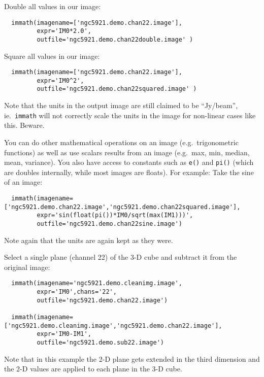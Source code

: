 Double all values in our image:
\small
\begin{verbatim}
  immath(imagename=['ngc5921.demo.chan22.image'],
         expr='IM0*2.0',
         outfile='ngc5921.demo.chan22double.image' )
\end{verbatim}
\normalsize
    
Square all values in our image:
\small
\begin{verbatim}
  immath(imagename=['ngc5921.demo.chan22.image'],
         expr='IM0^2',
         outfile='ngc5921.demo.chan22squared.image' )
\end{verbatim}
\normalsize
Note that the units in the output image are still claimed to be
``Jy/beam'', ie.\ {\tt immath} will not correctly scale the units
in the image for non-linear cases like this.  Beware.

You can do other mathematical operations on an image (e.g.\
trigonometric functions) as well as use scalars results from an image
(e.g.\ max, min, median, mean, variance).  You also have access to
constants such as {\tt e()} and {\tt pi()} (which are doubles
internally, while most images are floats). For example:
Take the sine of an image:
\small
\begin{verbatim}
  immath(imagename=['ngc5921.demo.chan22.image','ngc5921.demo.chan22squared.image'],
         expr='sin(float(pi())*IM0/sqrt(max(IM1)))',
         outfile='ngc5921.demo.chan22sine.image')
\end{verbatim}
\normalsize
Note again that the units are again kept as they were.
    
Select a single plane (channel 22) of the 3-D cube and  
subtract it from the original image: 
\small
\begin{verbatim}
  immath(imagename='ngc5921.demo.cleanimg.image',
         expr='IM0',chans='22',
         outfile='ngc5921.demo.chan22.image')

  immath(imagename=['ngc5921.demo.cleanimg.image','ngc5921.demo.chan22.image'],
         expr='IM0-IM1',
         outfile='ngc5921.demo.sub22.image')
\end{verbatim}
\normalsize
Note that in this example the 2-D plane gets extended in the third
dimension and the 2-D values are applied to each plane in the 3-D cube. 

    
